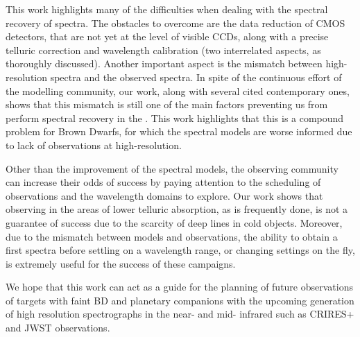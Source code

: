 This work highlights many of the difficulties when dealing with the spectral recovery of \nir{} spectra.
The obstacles to overcome are the data reduction of \nir{} CMOS detectors, that are not yet at the level of visible CCDs, along with a precise telluric correction and wavelength calibration (two interrelated aspects, as thoroughly discussed).
Another important aspect is the mismatch between \nir{} high-resolution spectra and the observed spectra.
In spite of the continuous effort of the modelling community, \textrm{our} work, along with several cited contemporary ones, shows that this mismatch is still one of the main factors preventing us from perform spectral recovery in the \nir{}.
This work highlights that this is a compound problem for Brown Dwarfs, for which the spectral models are worse informed due to lack of observations at high-resolution.

Other than the improvement of the spectral models, the observing community can increase their odds of success by paying attention to the scheduling of observations and the wavelength domains to explore.
Our work shows that observing in the areas of lower telluric absorption, as is frequently done, is not a guarantee of success due to the scarcity of deep lines in cold objects.
Moreover, due to the mismatch between models and observations, the ability to obtain a first spectra before settling on a wavelength range, or changing settings on the fly, is extremely useful for the success of these campaigns.

We hope that this work can act as a guide for the planning of future observations of targets with faint {BD} and planetary companions with the upcoming generation of high resolution spectrographs in the near- and mid- infrared such as CRIRES+ and {JWST} observations.



